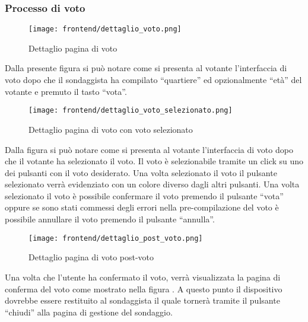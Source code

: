     \subsubsection{Processo di voto}
        \begin{figure}[H]
            \centering
            \texttt{[image: frontend/dettaglio\_voto.png]}
            \caption{Dettaglio pagina di voto}
            \label{fig:frontend-voto}
        \end{figure}
        Dalla presente figura  si può notare come si presenta al votante l'interfaccia di voto dopo che il sondaggista ha compilato ``quartiere'' ed opzionalmente ``età'' del votante e premuto il tasto ``vota''. 
        \begin{figure}[H]
            \centering
            \texttt{[image: frontend/dettaglio\_voto\_selezionato.png]}
            \caption{Dettaglio pagina di voto con voto selezionato}
            \label{fig:frontend-voto-selezionato}
        \end{figure}
        Dalla figura  si può notare come si presenta al votante l'interfaccia di voto dopo che il votante ha selezionato il voto. Il voto è selezionabile tramite un click su uno dei pulsanti con il voto desiderato. Una volta selezionato il voto il pulsante selezionato verrà evidenziato con un colore diverso dagli altri pulsanti. Una volta selezionato il voto è possibile confermare il voto premendo il pulsante ``vota'' oppure se sono stati commessi degli errori nella pre-compilazione del voto è possibile annullare il voto premendo il pulsante ``annulla''.
        \begin{figure}[H]
            \centering
            \texttt{[image: frontend/dettaglio\_post\_voto.png]}
            \caption{Dettaglio pagina di voto post-voto}
            \label{fig:frontend-voto-post}
        \end{figure}
        Una volta che l'utente ha confermato il voto, verrà visualizzata la pagina di conferma del voto come mostrato nella figura . A questo punto il dispositivo dovrebbe essere restituito al sondaggista il quale tornerà tramite il pulsante ``chiudi'' alla pagina di gestione del sondaggio.